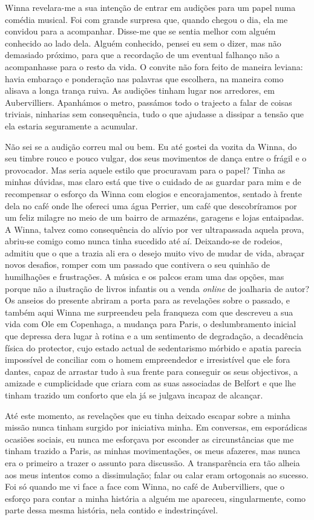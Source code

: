 Winna revelara-me a sua intenção de entrar em audições para um papel
numa comédia musical. Foi com grande surpresa que, quando chegou o
dia, ela me convidou para a acompanhar. Disse-me que se sentia melhor
com alguém conhecido ao lado dela. Alguém conhecido, pensei eu sem
o dizer, mas não demasiado próximo, para que a recordação de um eventual
falhanço não a acompanhasse para o resto da vida. O convite não fora
feito de maneira leviana: havia embaraço e ponderação nas palavras que
escolhera, na maneira como alisava a longa trança ruiva. As audições
tinham lugar nos arredores, em Aubervilliers. Apanhámos o metro,
passámos todo o trajecto a falar de coisas triviais, ninharias sem
consequência, tudo o que ajudasse a dissipar a tensão que ela estaria
seguramente a acumular.

Não sei se a audição correu mal ou bem. Eu até gostei da vozita da
Winna, do seu timbre rouco e pouco vulgar, dos seus movimentos de dança
entre o frágil e o provocador. Mas seria aquele estilo que procuravam
para o papel? Tinha as minhas dúvidas, mas claro está que tive o cuidado
de as guardar para mim e de recompensar o esforço da Winna com elogios e
encorajamentos, sentado à frente dela no café onde lhe ofereci uma água
Perrier, um café que descobríramos por um feliz milagre no meio de um
bairro de armazéns, garagens e lojas entaipadas. A Winna, talvez como
consequência do alívio por ver ultrapassada aquela prova, abriu-se
comigo como nunca tinha sucedido até aí. Deixando-se de rodeios, admitiu
que o que a trazia ali era o desejo muito vivo de mudar de vida,
abraçar novos desafios, romper com um passado que contivera o seu
quinhão de humilhações e frustrações. A música e os palcos eram uma das
opções, mas porque não a ilustração de livros infantis ou a venda
\emph{online }de joalharia de autor? Os anseios do presente abriram a
porta para as revelações sobre o passado, e também aqui Winna me
surpreendeu pela franqueza com que descreveu a sua vida com Ole em
Copenhaga, a mudança para Paris, o deslumbramento inicial que depressa
dera lugar à rotina e a um sentimento de degradação,
a decadência física do protector, cujo estado actual de
sedentarismo mórbido e apatia parecia impossível de conciliar com o
homem empreendedor e irresistível que ele fora dantes, capaz de arrastar
tudo à sua frente para conseguir os seus objectivos, a amizade e
cumplicidade que criara com as suas associadas de Belfort e que lhe
tinham trazido um conforto que ela já se julgava incapaz de alcançar.

Até este momento, as revelações que eu tinha deixado escapar sobre a
minha missão nunca tinham surgido por iniciativa minha. Em conversas,
em esporádicas ocasiões sociais, eu nunca me esforçava por esconder as
circunstâncias que me tinham trazido a Paris, as minhas movimentações,
os meus afazeres, mas nunca era o primeiro a trazer o assunto para discussão. A transparência era tão alheia aos meus intentos como a
dissimulação; falar ou calar eram ortogonais ao sucesso. Foi só quando
me vi face a face com Winna, no café de Aubervilliers, que o esforço
para contar a minha história a alguém me apareceu, singularmente, como
parte dessa mesma história, nela contido e indestrinçável.

